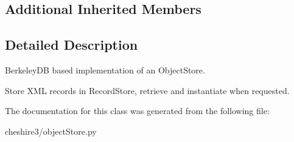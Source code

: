 \subsection*{Additional Inherited Members}


\subsection{Detailed Description}
\begin{DoxyVerb}BerkeleyDB based implementation of an ObjectStore.

Store XML records in RecordStore, retrieve and instantiate when requested.
\end{DoxyVerb}
 

The documentation for this class was generated from the following file\-:\begin{DoxyCompactItemize}
\item 
cheshire3/object\-Store.\-py\end{DoxyCompactItemize}
